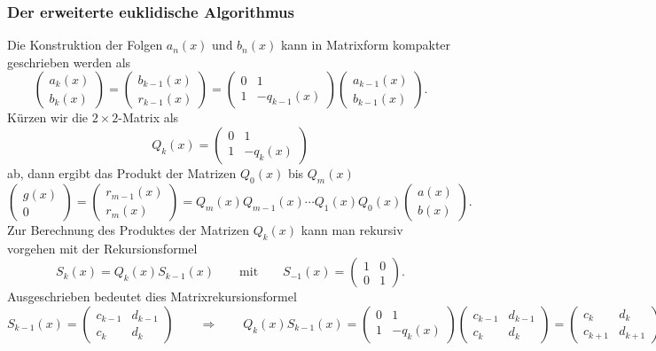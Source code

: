 \subsubsection{Der erweiterte euklidische Algorithmus}
%
%
%
Die Konstruktion der Folgen $a_n(x)$ und $b_n(x)$ kann in Matrixform
kompakter geschrieben werden als
\[
\begin{pmatrix}
a_k(x)\\
b_k(x)
\end{pmatrix}
=
\begin{pmatrix}
b_{k-1}(x)\\
r_{k-1}(x)
\end{pmatrix}
=
\begin{pmatrix}
0 & 1\\
1 & -q_{k-1}(x)
\end{pmatrix}
\begin{pmatrix}
a_{k-1}(x)\\
b_{k-1}(x)
\end{pmatrix}.
\]
Kürzen wir die $2\times 2$-Matrix als
\[
Q_k(x) = \begin{pmatrix} 0&1\\1&-q_k(x)\end{pmatrix}
\]
ab, dann ergibt das Produkt der Matrizen $Q_0(x)$ bis $Q_{m}(x)$
\[
\begin{pmatrix}
g(x)\\
0
\end{pmatrix}
=
\begin{pmatrix}
r_{m-1}(x)\\
r_{m}(x)
\end{pmatrix}
=
Q_{m}(x)
Q_{m-1}(x)
\cdots
Q_1(x)
Q_0(x)
\begin{pmatrix}
a(x)\\
b(x)
\end{pmatrix}.
\]
Zur Berechnung des Produktes der Matrizen $Q_k(x)$ kann man rekursiv
vorgehen mit der Rekursionsformel
\[
S_{k}(x) = Q_{k}(x) S_{k-1}(x)
\qquad\text{mit}\qquad
S_{-1}(x)
=
\begin{pmatrix} 1 & 0 \\ 0 & 1 \end{pmatrix}.
\]
Ausgeschrieben bedeutet dies Matrixrekursionsformel
\[
S_{k-1}(x)
=
\begin{pmatrix} 
c_{k-1} & d_{k-1} \\
c_k     & d_k
\end{pmatrix}
\qquad\Rightarrow\qquad
Q_{k}(x) S_{k-1}(x)
=
\begin{pmatrix}
0&1\\1&-q_k(x)
\end{pmatrix}
\begin{pmatrix} 
c_{k-1} & d_{k-1} \\
c_k     & d_k
\end{pmatrix}
=
\begin{pmatrix}
c_k&d_k\\
c_{k+1}&d_{k+1}
\end{pmatrix}.
\]
